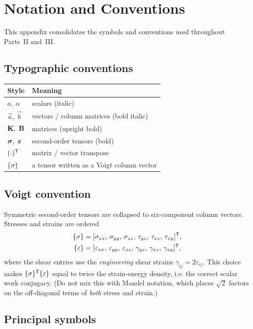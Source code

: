 \chapter{Notation and Conventions}
\label{app:notation}

This appendix consolidates the symbols and conventions used throughout
Parts~II and~III.

\section{Typographic conventions}

\begin{tabularx}{\linewidth}{lX}
  \toprule
  Style & Meaning \\
  \midrule
  $a,\ \alpha$        & scalars (italic) \\
  $\vec{u},\ \vec{b}$ & vectors / column matrices (bold italic) \\
  $\mat{K},\ \mat{B}$ & matrices (upright bold) \\
  $\stress,\ \strain$ & second-order tensors (bold) \\
  $(\cdot)^{\mathsf{T}}$ & matrix / vector transpose \\
  $\{\sigma\}$        & a tensor written as a Voigt column vector \\
  \bottomrule
\end{tabularx}

\section{Voigt convention}

Symmetric second-order tensors are collapsed to six-component column
vectors. Stresses and strains are ordered
\begin{align}
  \{\sigma\} &= [\sigma_{xx},\,\sigma_{yy},\,\sigma_{zz},\,\tau_{yz},\,\tau_{xz},\,\tau_{xy}]^{\mathsf{T}}, \\
  \{\varepsilon\} &= [\varepsilon_{xx},\,\varepsilon_{yy},\,\varepsilon_{zz},\,\gamma_{yz},\,\gamma_{xz},\,\gamma_{xy}]^{\mathsf{T}},
\end{align}
where the shear entries use the \emph{engineering} shear strains
$\gamma_{ij}=2\varepsilon_{ij}$. This choice makes $\{\sigma\}^{\mathsf{T}}\{\varepsilon\}$
equal to twice the strain-energy density, i.e. the correct scalar work
conjugacy. (Do not mix this with Mandel notation, which places
$\sqrt{2}$ factors on the off-diagonal terms of \emph{both} stress and
strain.)

\section{Principal symbols}

